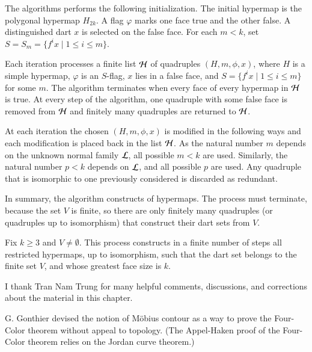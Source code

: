 The algorithms performs the following initialization.  The initial hypermap is the polygonal hypermap $H_{2k}$.  A flag $\varphi$ marks one face  true and the other false.  A distinguished dart $x$ is selected on the false face.  For each  $m<k$, set $S=S_m = \{f^i x\mid 1\le i\le m\}$.

Each iteration processes a finite list ${\cal H}$ of quadruples $(H,m,\phi,x)$, where $H$ is a simple hypermap, $\varphi$ is an $S$-flag, $x$ lies in a false face, and $S = \{f^i x\mid 1\le i\le m\}$ for some $m$.  The algorithm terminates when every face of every hypermap in ${\cal H}$ is true.  At every step of the algorithm, one quadruple with some false face is removed from ${\cal H}$ and finitely many quadruples are returned to ${\cal H}$.

At each iteration the chosen $(H,m,\phi,x)$ is modified in the following ways and each modification is placed back in the list ${\cal H}$.  As the natural number $m$ depends on the unknown normal family ${\cal L}$, all possible $m < k$ are used.  Similarly, the natural number $p < k$ depends on ${\cal L}$, and  all possible $p$ are used.  Any quadruple that is isomorphic to one previously considered is discarded as redundant. 

In summary, the algorithm constructs of hypermaps.  The process must terminate, because the set $V$ is finite, so there are only finitely many quadruples (or quadruples up to isomorphism) that construct their dart sets from $V$.

\begin{lemma}  Fix $k\ge 3$ and $V\ne \emptyset$.
This process constructs in a finite number of steps all restricted hypermaps, up to isomorphism,  such that the dart set belongs to the finite set $V$, and whose greatest face size is $k$.
\end{lemma}


\bigskip

\begin{note} %
 I thank Tran Nam Trung for many helpful comments, discussions, and corrections about the material in this chapter.
\end{note}

\begin{remark}
G. Gonthier devised the notion of M\"obius contour as a way to prove the Four-Color theorem without appeal to topology.  (The Appel-Haken proof of the Four-Color theorem relies on the Jordan curve theorem.)  
\end{remark}


